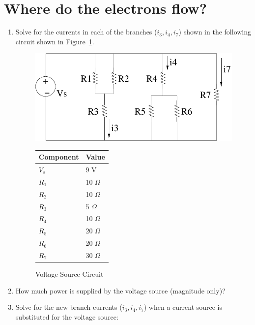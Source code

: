 \section{Where do the electrons flow?}

\begin{enumerate}
    \item Solve for the currents in each of the branches ($i_3, i_4, i_7$)
        shown in the following circuit shown in Figure~\ref{fig:p1vs}.

    \begin{figure}[h!]
    \begin{minipage}[l]{0.75\linewidth}
    \centering
    \includegraphics[width=0.75\linewidth]{p1/p1vs}
    \caption{Voltage Source Circuit}
    \label{fig:p1vs}
    \end{minipage}\hfill
    \begin{minipage}[l]{0.25\linewidth}
    \vspace*{-0.25in}
    \begin{tabular}{|l|l|}
    \hline
    Component & Value \\ \hline
    $V_s$ & 9 V \\ \hline
    $R_1$ & 10 $\Omega$ \\ \hline
    $R_2$ & 10 $\Omega$ \\ \hline
    $R_3$ & 5 $\Omega$ \\ \hline
    $R_4$ & 10 $\Omega$ \\ \hline
    $R_5$ & 20 $\Omega$ \\ \hline
    $R_6$ & 20 $\Omega$ \\ \hline
    $R_7$ & 30 $\Omega$ \\ \hline
    \end{tabular}
    \end{minipage}
    \end{figure}

    \item How much power is supplied by the voltage source (magnitude only)?

    \item Solve for the new branch currents ($i_3, i_4, i_7$) when a current
        source is substituted for the voltage source:


\end{enumerate}
